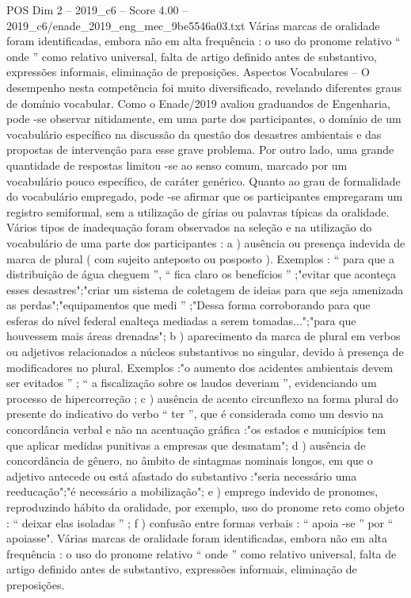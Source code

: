 \begin{textsample}{POS Dim 2 – 2019\_c6 – Score 4.00 – 2019\_c6/enade\_2019\_eng\_mec\_9be5546a03.txt}
Várias marcas de oralidade foram identificadas, embora não em alta frequência : o uso do pronome relativo “ onde ” como relativo universal, falta de artigo definido antes de substantivo, expressões informais, eliminação de preposições.
Aspectos Vocabulares – O desempenho nesta competência foi muito diversificado, revelando diferentes graus de domínio vocabular.
Como o Enade/2019 avaliou graduandos de Engenharia, pode -se observar nitidamente, em uma parte dos participantes, o domínio de um vocabulário específico na discussão da questão dos desastres ambientais e das propostas de intervenção para esse grave problema.
Por outro lado, uma grande quantidade de respostas limitou -se ao senso comum, marcado por um vocabulário pouco específico, de caráter genérico.
Quanto ao grau de formalidade do vocabulário empregado, pode -se afirmar que os participantes empregaram um registro semiformal, sem a utilização de gírias ou palavras típicas da oralidade.
Vários tipos de inadequação foram observados na seleção e na utilização do vocabulário de uma parte dos participantes : a ) ausência ou presença indevida de marca de plural ( com sujeito anteposto ou posposto ).
Exemplos : “ para que a distribuição de água cheguem ”, “ fica claro os benefícios ” ;"evitar que aconteça esses desastres";"criar um sistema de coletagem de ideias para que seja amenizada as perdas";"equipamentos que medi ” ;"Dessa forma corroborando para que esferas do nível federal enalteça mediadas a serem tomadas...";"para que houvessem mais áreas drenadas"; b ) aparecimento da marca de plural em verbos ou adjetivos relacionados a núcleos substantivos no singular, devido à presença de modificadores no plural.
Exemplos :"o aumento dos acidentes ambientais devem ser evitados ” ; “ a fiscalização sobre os laudos deveriam ”, evidenciando um processo de hipercorreção ; c ) ausência de acento circunflexo na forma plural do presente do indicativo do verbo “ ter ”, que é considerada como um desvio na concordância verbal e não na acentuação gráfica :"os estados e municípios tem que aplicar medidas punitivas a empresas que desmatam"; d ) ausência de concordância de gênero, no âmbito de sintagmas nominais longos, em que o adjetivo antecede ou está afastado do substantivo :"seria necessário uma reeducação";"é necessário a mobilização"; e ) emprego indevido de pronomes, reproduzindo hábito da oralidade, por exemplo, uso do pronome reto como objeto : “ deixar elas isoladas ” ; f ) confusão entre formas verbais : “ apoia -se ” por “ apoiasse".
Várias marcas de oralidade foram identificadas, embora não em alta frequência : o uso do pronome relativo “ onde ” como relativo universal, falta de artigo definido antes de substantivo, expressões informais, eliminação de preposições.

\end{textsample}
